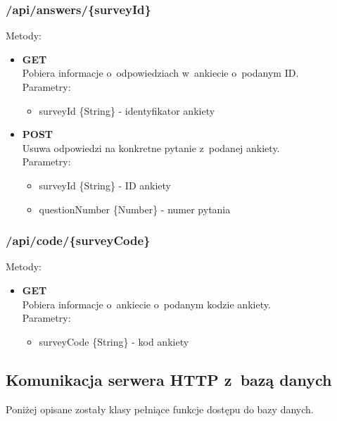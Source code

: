\documentclass[12pt,a4paper,notitlepage]{article}
\begin{document}
\subsubsection{/api/answers/\{surveyId\}}
Metody:
\begin{itemize}
\item \textbf{GET} \\ Pobiera informacje o~odpowiedziach w~ankiecie o~podanym ID. \\ Parametry:
	\begin{itemize}
	\item surveyId \{String\} - identyfikator ankiety
	\end{itemize}
\item \textbf{POST} \\ Usuwa odpowiedzi na konkretne pytanie z~podanej ankiety. \\ Parametry:
	\begin{itemize}
	\item surveyId \{String\} - ID ankiety
	\item questionNumber \{Number\} - numer pytania
	\end{itemize}

\end{itemize}

\subsubsection{/api/code/\{surveyCode\}}
Metody:
\begin{itemize}
\item \textbf{GET} \\ Pobiera informacje o~ankiecie o~podanym kodzie ankiety. \\ Parametry:
	\begin{itemize}
	\item surveyCode \{String\} - kod ankiety
	\end{itemize}

\end{itemize}

\subsection{Komunikacja serwera HTTP z~bazą danych}
Poniżej opisane zostały klasy pełniące funkcje dostępu do bazy danych.
\end{document}
